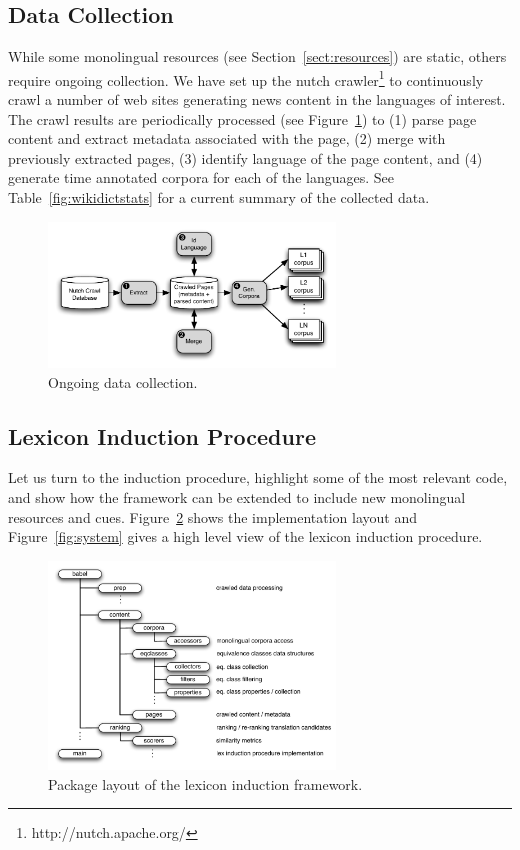 \documentclass{article}
\newcommand{\secref}[1]{Section~\ref{#1}}
\newcommand{\tabref}[1]{Table~\ref{#1}}
\newcommand{\figref}[1]{Figure~\ref{#1}}
\begin{document}
\subsection{Data Collection} \label{sect:datacollect}

While some monolingual resources (see \secref{sect:resources}) are static, others require ongoing collection.  We have set up the nutch crawler\footnote{http://nutch.apache.org/} to continuously crawl a number of web sites generating news content in the languages of interest.  The crawl results are periodically processed (see \figref{fig:data}) to (1) parse page content and extract metadata associated with the page, (2) merge with previously extracted pages, (3) identify language of the page content, and (4) generate time annotated corpora for each of the languages.  See \tabref{fig:wikidictstats} for a current summary of the collected data.

\begin{figure}[h]
\centerline{\mbox{\includegraphics[width=3in]{figures/datacollect}}}
\caption{Ongoing data collection.}
\label{fig:data}
\end{figure}

\subsection{Lexicon Induction Procedure}

Let us turn to the induction procedure, highlight some of the most relevant code, and show how the framework can be extended to include new monolingual resources and cues.  \figref{fig:packages} shows the implementation layout and \figref{fig:system} gives a high level view of the lexicon induction procedure.\\

\begin{figure}[h]
\centerline{\mbox{\includegraphics[width=3in]{figures/packages}}}
\caption{Package layout of the lexicon induction framework.}
\label{fig:packages}
\end{figure}
\end{document}
